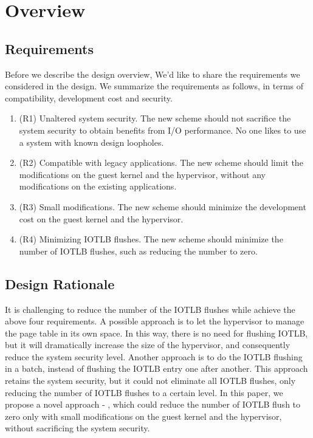 \section{\name Overview} \label{sec:overview}
\subsection{Requirements}\label{sec:req}
Before we describe the design overview, We'd like to share the requirements we considered in the design.
We summarize the requirements as follows, in terms of compatibility, development cost and security.
\begin{enumerate}
\item (R1) Unaltered system security. The new scheme should not sacrifice the system security to obtain benefits from I/O performance. No one likes to use a system with known design loopholes.
\item (R2) Compatible with legacy applications. The new scheme should limit the modifications on the guest kernel and the hypervisor, without any modifications on the existing applications.
\item (R3) Small modifications. The new scheme should minimize the development cost on the guest kernel and the hypervisor.
\item (R4) Minimizing IOTLB flushes. The new scheme should minimize the number of IOTLB flushes, such as reducing the number to zero.
\end{enumerate}

\subsection{Design Rationale}\label{sec:rationale}
It is challenging to reduce the number of the IOTLB
flushes while achieve the above four requirements.
A possible approach is to let the hypervisor to manage the page table in its own space.
In this way, there is no need for flushing IOTLB, but it will dramatically increase the size of the hypervisor, and consequently reduce the system security level.
Another approach is to do the IOTLB flushing in a batch, instead of flushing the IOTLB entry one after another.
This approach retains the system security, but it could not eliminate all IOTLB flushes, only reducing the number of IOTLB flushes to a certain level.
In this paper, we propose a novel approach - \name, which could reduce the number of IOTLB flush to zero only with small modifications on the guest kernel and the hypervisor, without sacrificing the system security.

